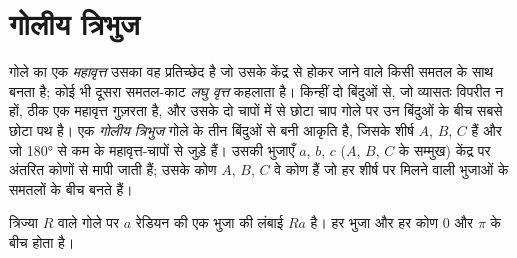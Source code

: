 \section{गोलीय त्रिभुज}

\begin{definition}[महावृत्त, गोलीय त्रिभुज]\label{def:b1:spherical-astronomy:spherical-triangle}
गोले का एक \emph{महावृत्त} उसका वह प्रतिच्छेद है जो उसके केंद्र से होकर
जाने वाले किसी समतल के साथ बनता है; कोई भी दूसरा समतल-काट \emph{लघु वृत्त}
कहलाता है। किन्हीं दो बिंदुओं से, जो व्यासतः विपरीत न हों, ठीक एक महावृत्त गुज़रता है, और
उसके दो चापों में से छोटा चाप गोले पर उन बिंदुओं के बीच सबसे छोटा पथ है। एक
\emph{गोलीय त्रिभुज} गोले के तीन बिंदुओं से बनी आकृति है, जिसके
शीर्ष $A$, $B$, $C$ हैं और जो \ang{180} से कम के महावृत्त-चापों से जुड़े हैं। उसकी भुजाएँ
$a$, $b$, $c$ ($A$, $B$, $C$ के सम्मुख) केंद्र पर अंतरित कोणों से मापी जाती हैं; उसके कोण
$A$, $B$, $C$ वे कोण हैं जो हर शीर्ष पर मिलने वाली भुजाओं के समतलों के बीच बनते हैं।
\end{definition}

त्रिज्या $R$ वाले गोले पर $a$ रेडियन की एक भुजा की लंबाई $Ra$ है। हर भुजा और हर कोण
$0$ और $\pi$ के बीच होता है।

